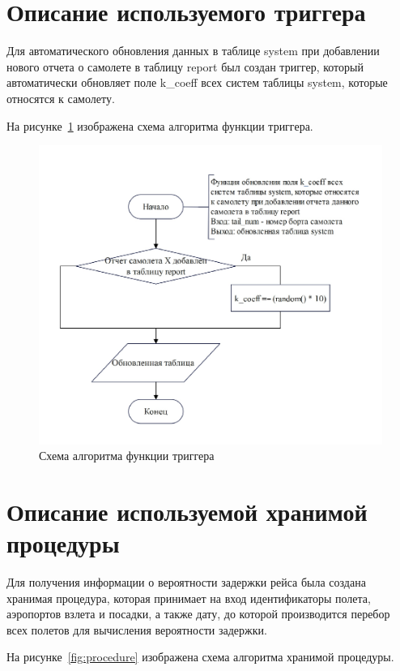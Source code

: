 \section{Описание используемого триггера}

Для автоматического обновления данных в таблице system при добавлении нового отчета о самолете в таблицу report был создан триггер, который автоматически обновляет поле k\_coeff всех систем таблицы system, которые относятся к самолету.

На рисунке~\ref{fig:trigger} изображена схема алгоритма функции триггера.

\begin{figure}[H]
    \centering
    \includegraphics[scale=0.8]{inc/Drawing4}
    \caption{Схема алгоритма функции триггера}
    \label{fig:trigger}
\end{figure}

\section{Описание используемой хранимой процедуры}

Для получения информации о вероятности задержки рейса была создана хранимая процедура, которая принимает на вход идентификаторы полета, аэропортов взлета и посадки, а также дату, до которой производится перебор всех полетов для вычисления вероятности задержки.

На рисунке~\ref{fig:procedure} изображена схема алгоритма хранимой процедуры.

